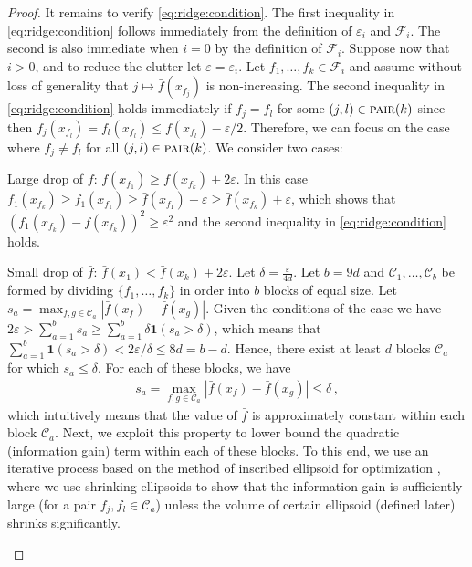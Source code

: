 \documentclass[letter, 12pt]{report}
\newcommand{\pair}{\operatorname{\textsc{pair}}}
\newcommand{\cC}{\mathcal C}
\newcommand{\sF}{\mathscr F}
\newcommand{\sind}{\bm{1}}
\newcommand{\1}{\mathbf{1}}
\renewcommand{\epsilon}{\varepsilon}
\theoremstyle{plain}
\theoremstyle{definition}
\theoremstyle{remark}
\begin{document}
\begin{proof}
    It remains to verify \cref{eq:ridge:condition}.
    The first inequality in \cref{eq:ridge:condition} follows immediately from the definition of $\epsilon_i$ and $\sF_i$. The second is also immediate when $i = 0$ by the definition of $\sF_i$.
    Suppose now that $i > 0$, and to reduce the clutter let $\epsilon = \epsilon_i$.
    Let $f_1,\ldots,f_k \in \sF_i$ and
    assume without loss of generality that $j \mapsto \bar f(x_{f_j})$ is non-increasing.
    The second inequality in \cref{eq:ridge:condition} holds immediately if $f_j = f_l$ for some $(j,l) \in \pair(k)$ since then $f_j(x_{f_l}) = f_l(x_{f_l}) \leq \bar f(x_{f_l}) - \epsilon/2$.
    Therefore, we can focus on the case where $f_j \neq f_l$ for all $(j,l) \in \pair(k)$. We consider two cases:
    \begin{enumcases}
        \item Large drop of $\bar{f}$: $\bar f(x_{f_1}) \geq \bar f(x_{f_k}) + 2\epsilon$. In this case
        $f_1(x_{f_k}) \geq f_1(x_{f_1}) \geq \bar f(x_{f_1}) - \epsilon \geq \bar f(x_{f_k}) + \epsilon$,
        which shows that $(f_1(x_{f_k}) - \bar f(x_{f_k}))^2 \geq \epsilon^2$ and the second inequality in \cref{eq:ridge:condition} holds.
        \item Small drop of $\bar{f}$: $\bar f(x_1) < \bar f(x_k) + 2\epsilon$. Let $\delta = \frac{\epsilon}{4d}$.
        Let $b = 9d$ and $\cC_1,\ldots,\cC_b$ be formed by dividing $\{f_1,\ldots,f_k\}$ in order into $b$ blocks of equal size.
        Let $s_a = \max_{f,g \in \cC_a} |\bar f(x_f) - \bar f(x_g)|$.
        Given the conditions of the case we have $2\epsilon > \sum_{a=1}^b s_a \geq \sum_{a=1}^b \delta \sind(s_a > \delta)$,
        which means that $\sum_{a=1}^b \sind(s_a > \delta) < 2\epsilon / \delta \leq 8d = b - d$.
        Hence, there exist at least $d$ blocks $\cC_a$ for which $s_a \leq \delta$.
        For each of these blocks, we have
        \begin{align*}
            s_a = \max_{f,g \in \cC_a} |\bar f(x_f) - \bar f(x_g)| \leq \delta\,,
        \end{align*}
        which intuitively means that the value of $\bar{f}$ is approximately constant within each block $\cC_a$.
        Next, we exploit this property to lower bound the quadratic (information gain) term within each of these blocks.
        To this end, we use an iterative process based on the method of inscribed ellipsoid for optimization \citep{tarasov1988method}, where we use shrinking ellipsoids to show that the information gain is sufficiently large (for a pair $f_j, f_l \in \cC_a$) unless the volume of certain ellipsoid (defined later) shrinks significantly.


\end{enumcases}
\end{proof}
\end{document}
